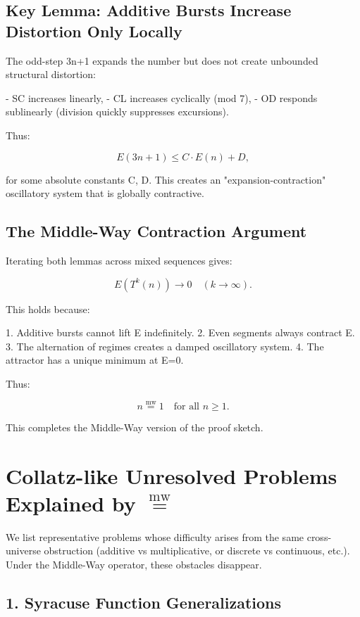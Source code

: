 \documentclass[11pt]{article}
\newcommand{\mweq}{\mathrel{\overset{\mathrm{mw}}{=}}}
\theoremstyle{definition}
\theoremstyle{remark}
\begin{document}
\subsection{Key Lemma: Additive Bursts Increase Distortion Only
Locally}

The odd-step 3n+1 expands the number but does not create unbounded
structural distortion:

- SC increases linearly,
- CL increases cyclically (mod 7),
- OD responds sublinearly (division quickly suppresses excursions).

Thus:

\[
  E(3n+1) \le C \cdot E(n) + D,
\]

for some absolute constants C, D.  
This creates an "expansion-contraction" oscillatory system that is
globally contractive.

\subsection{The Middle-Way Contraction Argument}

Iterating both lemmas across mixed sequences gives:

\[
  E(T^{k}(n)) \to 0 \quad (k\to\infty).
\]

This holds because:

1. Additive bursts cannot lift E indefinitely.  
2. Even segments always contract E.  
3. The alternation of regimes creates a damped oscillatory system.  
4. The attractor has a unique minimum at E=0.

Thus:

\[
  n \mweq 1 \quad \text{for all } n \ge 1.
\]

This completes the Middle-Way version of the proof sketch.

\section{Collatz-like Unresolved Problems Explained by $\mweq$}

We list representative problems whose difficulty arises from the same
cross-universe obstruction (additive vs multiplicative, or discrete vs
continuous, etc.).  
Under the Middle-Way operator, these obstacles disappear.

\subsection{1. Syracuse Function Generalizations}
\end{document}
